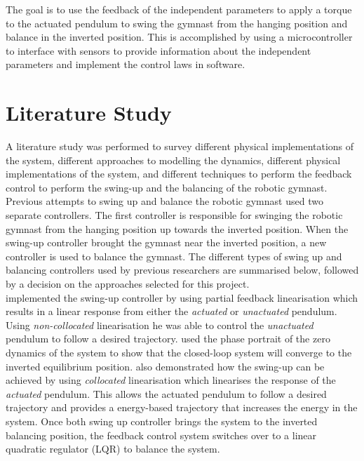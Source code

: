 The goal is to use the feedback of the independent parameters to apply a torque to the actuated pendulum to swing the gymnast from the hanging position and balance in the inverted position. This is accomplished by using a microcontroller to interface with sensors to provide information about the independent parameters and implement the control laws in software.\\


\section{Literature Study}
\label{sec:literature_study}

A literature study was performed to survey different physical implementations of the system, different approaches to modelling the dynamics, different physical implementations of the system, and different techniques to perform the feedback control to perform the swing-up and the balancing of the robotic gymnast.\\

Previous attempts to swing up and balance the robotic gymnast used two separate controllers. The first controller is responsible for swinging the robotic gymnast from the hanging position up towards the inverted position. When the swing-up controller brought the gymnast near the inverted position, a new controller is used to balance the gymnast. The different types of swing up and balancing controllers used by previous researchers are summarised below, followed by a decision on the approaches selected for this project.\\

\citet{spong_swingup} implemented the swing-up controller by using partial feedback linearisation which results in a linear response from either the \textit{actuated} or \textit{unactuated} pendulum. Using \textit{non-collocated} linearisation he was able to control the \textit{unactuated} pendulum to follow a desired trajectory. \citeauthor{spong_swingup} used the phase portrait of the zero dynamics of the system to show that the closed-loop system will converge to the inverted equilibrium position. \citeauthor{spong_swingup} also demonstrated how the swing-up can be achieved by using \textit{collocated} linearisation which linearises the response of the \textit{actuated} pendulum. This allows the actuated pendulum to follow a desired trajectory and \citeauthor{spong_swingup} provides a energy-based trajectory that increases the energy in the system. Once both swing up controller brings the system to the inverted balancing position, the feedback control system switches over to a linear quadratic regulator (LQR) to balance the system.\\

